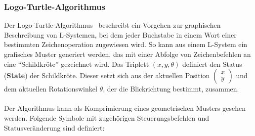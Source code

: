 \documentclass[11pt]{article}
\begin{document}
    \subsubsection{Logo-Turtle-Algorithmus}
    Der Logo-Turtle-Algorithmus~\cite{4} beschreibt ein Vorgehen zur graphischen Beschreibung von L-Systemen, bei dem
    jeder Buchstabe in einem Wort einer bestimmten Zeichenoperation zugewiesen wird.
    So kann aus einem L-System ein grafisches Muster generiert werden, das mit einer Abfolge von Zeichenbefehlen an
    eine "`Schildkröte"' gezeichnet wird.
    Das Triplett $(x,y,\theta)$ definiert den Status (\textbf{State}) der Schildkröte.
    Dieser setzt sich aus der aktuellen Position $\left(\begin{smallmatrix} x \\ y \end{smallmatrix}\right)$ und dem
    aktuellen Rotationswinkel $\theta$, der die Blickrichtung bestimmt, zusammen.\\~\\
    Der Algorithmus kann als Komprimierung eines geometrischen Musters gesehen werden.
    Folgende Symbole mit zugehörigen Steuerungsbefehlen und Statusveränderung sind definiert:
\end{document}
